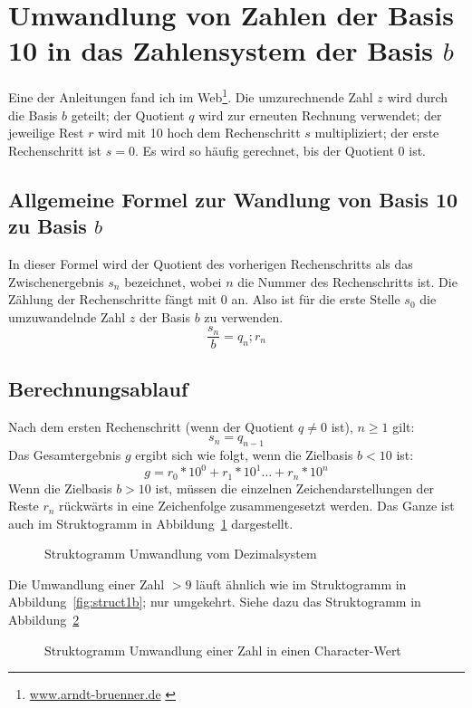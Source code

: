 \documentclass[a4paper,12pt,twoside]{book}
\begin{document}
\section{Umwandlung von Zahlen der Basis 10 in das Zahlensystem der Basis $b$}
Eine der Anleitungen fand ich im Web\footnote{\href{http://www.arndt-bruenner.de}{www.arndt-bruenner.de} \cite{zs:ab:2015}}.
Die umzurechnende Zahl $z$ wird durch die Basis $b$ geteilt; der Quotient $q$ wird zur erneuten Rechnung verwendet; der jeweilige Rest $r$ wird mit 10 hoch dem Rechenschritt $s$ multipliziert; der erste Rechenschritt ist $s = 0$. Es wird so häufig gerechnet, bis der Quotient 0 ist. 
\subsection{Allgemeine Formel zur Wandlung von Basis 10 zu Basis $b$}
In dieser Formel wird der Quotient des vorherigen Rechenschritts als das Zwischenergebnis $s_{n}$ bezeichnet, wobei $n$ die Nummer des Rechenschritts ist. Die Zählung der Rechenschritte fängt mit 0 an.
Also ist für die erste Stelle $s_{0}$ die umzuwandelnde Zahl $z$ der Basis $b$ zu verwenden.
\begin{equation}
\frac{s_{n}}{b} = q_{n} ; r_{n}
\label{eq:10-b}
\end{equation}
\subsection{Berechnungsablauf}
Nach dem ersten Rechenschritt (wenn der Quotient $q \neq 0$ ist), $n \geq 1$ gilt: 
\begin{equation}
s_{n}=q_{n-1}
\end{equation}
Das Gesamtergebnis $g$ ergibt sich wie folgt, wenn die Zielbasis $b < 10$ ist:
\begin{equation}
g = r_{0} * 10^0 + r_{1} * 10^1 \dots + r_{n} * 10^n
\label{eq:10-b_g9}
\end{equation}
Wenn die Zielbasis $b > 10$ ist, müssen die einzelnen Zeichendarstellungen der Reste $r_{n}$ rückwärts in eine Zeichenfolge zusammengesetzt werden. Das Ganze ist auch im Struktogramm in Abbildung~\ref{fig:struct2} dargestellt.
\begin{figure}
	
	\caption{Struktogramm Umwandlung vom Dezimalsystem}
	\label{fig:struct2}	
\end{figure}
Die Umwandlung einer Zahl $ > 9$ läuft ähnlich wie im Struktogramm in Abbildung~\ref{fig:struct1b}; nur umgekehrt. Siehe dazu das Struktogramm in Abbildung~\ref{fig:struct2b}
\begin{figure}
	
	\caption{Struktogramm Umwandlung einer Zahl in einen Character-Wert}
	\label{fig:struct2b}
\end{figure}


\appendix



\printindex
\end{document}
